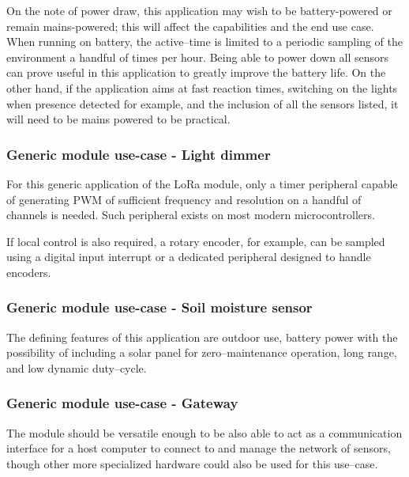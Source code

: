 On the note of power draw, this application may wish to be battery-powered or remain mains-powered; this will affect the capabilities and the end use case. When running on battery, the active--time is limited to a periodic sampling of the environment a handful of times per hour. Being able to power down all sensors can prove useful in this application to greatly improve the battery life. On the other hand, if the application aims at fast reaction times, switching on the lights when presence detected for example, and the inclusion of all the sensors listed, it will need to be mains powered to be practical.

\subsubsection{Generic module use-case - Light dimmer}
For this generic application of the LoRa module, only a timer peripheral capable of generating PWM of sufficient frequency and resolution on a handful of channels is needed. Such peripheral exists on most modern microcontrollers.

If local control is also required, a rotary encoder, for example, can be sampled using a digital input interrupt or a dedicated peripheral designed to handle encoders.

\subsubsection{Generic module use-case - Soil moisture sensor}
The defining features of this application are outdoor use, battery power with the possibility of including a solar panel for zero--maintenance operation, long range, and low dynamic duty--cycle.

\subsubsection{Generic module use-case - Gateway}
The module should be versatile enough to be also able to act as a communication interface for a host computer to connect to and manage the network of sensors, though other more specialized hardware could also be used for this use--case.

